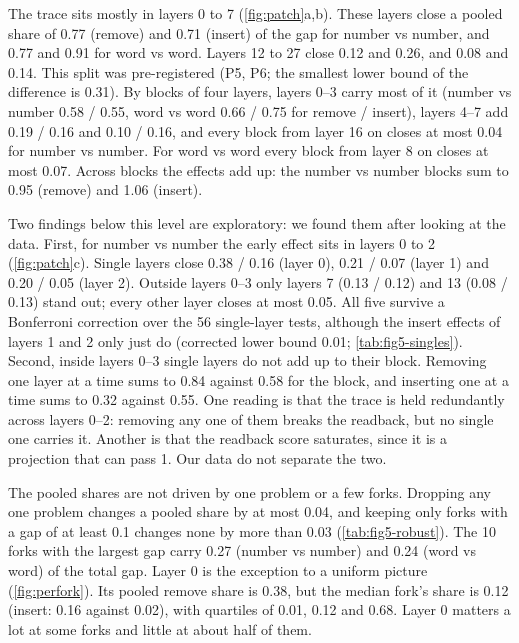 The trace sits mostly in layers 0 to 7 (\cref{fig:patch}a,b). %
These layers close a pooled share of 0.77 (remove) and 0.71 (insert) of the gap for number vs number, %
and 0.77 and 0.91 for word vs word. %
Layers 12 to 27 close 0.12 and 0.26, and 0.08 and 0.14. %
This split was pre-registered (P5, P6; the smallest lower bound of the difference is 0.31). %
By blocks of four layers, layers 0--3 carry most of it %
(number vs number 0.58 / 0.55, word vs word 0.66 / 0.75 for remove / insert), %
layers 4--7 add 0.19 / 0.16 and 0.10 / 0.16, %
and every block from layer 16 on closes at most 0.04 for number vs number. %
For word vs word every block from layer 8 on closes at most 0.07. %
Across blocks the effects add up: the number vs number blocks sum to 0.95 (remove) and 1.06 (insert). %

Two findings below this level are exploratory: we found them after looking at the data.
First, for number vs number the early effect sits in layers 0 to 2 (\cref{fig:patch}c). %
Single layers close 0.38 / 0.16 (layer 0), 0.21 / 0.07 (layer 1) and 0.20 / 0.05 (layer 2). %
Outside layers 0--3 only layers 7 (0.13 / 0.12) and 13 (0.08 / 0.13) stand out; %
every other layer closes at most 0.05. %
All five survive a Bonferroni correction over the 56 single-layer tests, %
although the insert effects of layers 1 and 2 only just do (corrected lower bound 0.01; \cref{tab:fig5-singles}). %
Second, inside layers 0--3 single layers do not add up to their block. %
Removing one layer at a time sums to 0.84 against 0.58 for the block, %
and inserting one at a time sums to 0.32 against 0.55. %
One reading is that the trace is held redundantly across layers 0--2: %
removing any one of them breaks the readback, but no single one carries it.
Another is that the readback score saturates, since it is a projection that can pass 1.
Our data do not separate the two.

The pooled shares are not driven by one problem or a few forks.
Dropping any one problem changes a pooled share by at most 0.04, %
and keeping only forks with a gap of at least 0.1 changes none by more than 0.03 (\cref{tab:fig5-robust}). %
The 10 forks with the largest gap carry 0.27 (number vs number) and 0.24 (word vs word) of the total gap. %
Layer 0 is the exception to a uniform picture (\cref{fig:perfork}).
Its pooled remove share is 0.38, but the median fork's share is 0.12 %
(insert: 0.16 against 0.02), with quartiles of 0.01, 0.12 and 0.68. %
Layer 0 matters a lot at some forks and little at about half of them.

